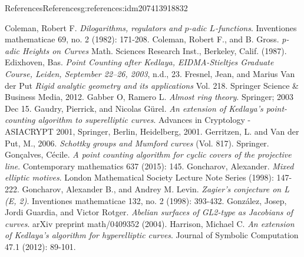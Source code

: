 \documentclass[oneside,10pt,]{book}
\numberwithin{equation}{section}
\begin{document}
\begin{references-chapter-numberless}{References}{}{References}{}{}{g:references:idm207413918832}
\begin{thebibliography}{9}
\hypertarget{x:biblio:bib-coleman-dilogs}{}Coleman, Robert F. \textit{Dilogarithms, regulators and \(p\)-adic \(L\)-functions}. Inventiones mathematicae 69, no. 2 (1982): 171-208.
\hypertarget{x:biblio:bib-coleman-gross}{}Coleman, Robert F., and B. Gross. \textit{p-adic Heights on Curves} Math. Sciences Research Inst., Berkeley, Calif. (1987).
\hypertarget{x:biblio:bib-edixhoven-after}{}Edixhoven, Bas. \textit{Point Counting after Kedlaya, EIDMA-Stieltjes Graduate Course, Leiden, September 22–26, 2003}, n.d., 23.
\hypertarget{x:biblio:bib-fresnel-van-der-put}{}Fresnel, Jean, and Marius Van der Put \textit{Rigid analytic geometry and its applications} Vol. 218. Springer Science \& Business Media, 2012.
\hypertarget{x:biblio:bib-gabber-ramero}{}Gabber O, Ramero L. \textit{Almost ring theory}. Springer; 2003 Dec 15.
\hypertarget{x:biblio:bib-gaudry-gurel}{}Gaudry, Pierrick, and Nicolas Gürel. \textit{An extension of Kedlaya's point-counting algorithm to superelliptic curves}. Advances in Cryptology - ASIACRYPT 2001, Springer, Berlin, Heidelberg, 2001.
\hypertarget{x:biblio:bib-gerritzen-van-der-put}{}Gerritzen, L. and Van der Put, M., 2006. \textit{Schottky groups and Mumford curves} (Vol. 817). Springer.
\hypertarget{x:biblio:bib-goncalves}{}Gonçalves, Cécile. \textit{A point counting algorithm for cyclic covers of the projective line}. Contemporary mathematics 637 (2015): 145.
\hypertarget{x:biblio:bib-goncharov-mixed}{}Goncharov, Alexander. \textit{Mixed elliptic motives}. London Mathematical Society Lecture Note Series (1998): 147-222.
\hypertarget{x:biblio:bib-gl}{}Goncharov, Alexander B., and Andrey M. Levin. \textit{Zagier's conjecture on L (E, 2)}. Inventiones mathematicae 132, no. 2 (1998): 393-432.
\hypertarget{x:biblio:bib-gonzales-guardia-rotger}{}González, Josep, Jordi Guardia, and Victor Rotger. \textit{Abelian surfaces of GL2-type as Jacobians of curves}. arXiv preprint math\slash{}0409352 (2004).
\hypertarget{x:biblio:bib-harrison-hyperelliptic}{}Harrison, Michael C. \textit{An extension of Kedlaya's algorithm for hyperelliptic curves}. Journal of Symbolic Computation 47.1 (2012): 89-101.

\end{thebibliography}
\end{references-chapter-numberless}
\end{document}
